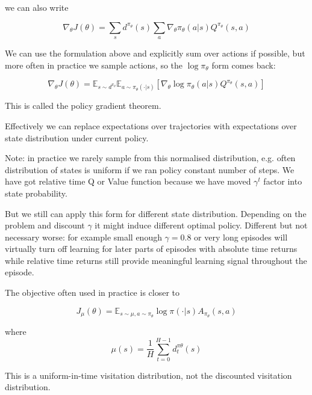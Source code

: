 \documentclass[preprint,12pt]{elsarticle}
\begin{document}
we can also write

\begin{equation}
\label{eq:policy-gradient-state-sum-direct}
\nabla_\theta J(\theta) = \sum_s d^{\pi_\theta}(s) \sum_a \nabla_\theta \pi_\theta(a|s) Q^{\pi_\theta}(s,a)
\end{equation}

We can use the formulation above and explicitly sum over actions if possible, but more often in practice we sample actions, so the $\log \pi_\theta$ form comes back:

\begin{equation}
\label{eq:policy-gradient-theorem}
\nabla_\theta J(\theta) = \mathbb{E}_{s \sim d^{\pi_\theta}} \mathbb{E}_{a \sim \pi_\theta(\cdot|s)} [\nabla_\theta \log \pi_\theta(a|s) Q^{\pi_\theta}(s,a)]
\end{equation}

This is called the policy gradient theorem.

Effectively we can replace expectations over trajectories with expectations over state distribution under current policy.


Note: in practice we rarely sample from this normalised distribution, e.g. often distribution of states is uniform if we ran policy constant number of steps. We have got relative time Q or Value function because we have moved $\gamma^t$ factor into state probability. 

But we still can apply this form for different state distribution. Depending on the problem and discount $\gamma$ it might induce different optimal policy. Different but not necessary worse: for example small enough $\gamma=0.8$ or very long episodes will virtually turn off learning for later parts of episodes with absolute time returns while relative time returns still provide meaningful learning signal throughout the episode.

The objective often used in practice is closer to

\begin{equation}
\label{practical-objective}
J_{\mu}(\theta)=\mathbb{E}_{s \sim \mu, a \sim \pi_\theta} \log   \pi(\cdot | s) A_{\pi_\theta}(s, a)
\end{equation}

where 
\begin{equation}
\label{uniform-in-time-distribution}
\mu(s) = \frac{1}{H} \sum_{t=0}^{H-1} d_t^{\pi \theta}(s)
\end{equation}

This is a uniform-in-time visitation distribution, not the discounted visitation distribution.
\end{document}
